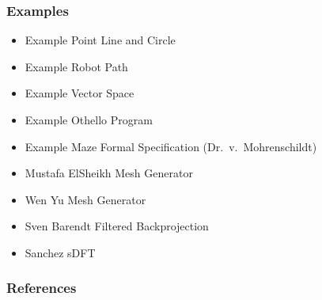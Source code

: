 \documentclass[t,12pt,numbers,fleqn]{beamer}
\begin{document}
\begin{frame}
\frametitle{Examples}

\begin{itemize}
\item Example Point Line and Circle
\item Example Robot Path
\item Example Vector Space
\item Example Othello Program
\item Example Maze Formal Specification (Dr.\ v.\ Mohrenschildt)
\item Mustafa ElSheikh Mesh Generator \cite{CaretteEtAl2011}
\item Wen Yu Mesh Generator \cite{SmithAndYu2009}
\item Sven Barendt Filtered Backprojection
\item Sanchez sDFT
\end{itemize}

\end{frame}


\begin{frame}[allowframebreaks]
\frametitle{References}



\end{frame}

\end{document}
